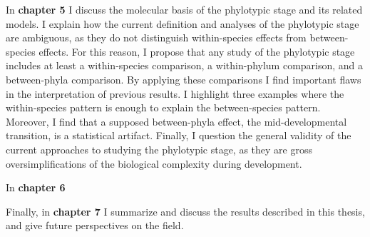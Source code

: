 In \textbf{chapter 5} I discuss the molecular basis of the phylotypic stage and its related models. I explain how the current definition and analyses of the phylotypic stage are ambiguous, as they do not distinguish within-species effects from between-species effects. For this reason, I propose that any study of the phylotypic stage includes at least a within-species comparison, a within-phylum comparison, and a between-phyla comparison. By applying these comparisons I find important flaws in the interpretation of previous results. I highlight three examples where the within-species pattern is enough to explain the between-species pattern. Moreover, I find that a supposed between-phyla effect, the mid-developmental transition, is a statistical artifact. Finally, I question the general validity of the current approaches to studying the phylotypic stage, as they are gross oversimplifications of the biological complexity during development.

In \textbf{chapter 6} 

Finally, in \textbf{chapter 7} I summarize and discuss the results described in this thesis, and give future perspectives on the field.
